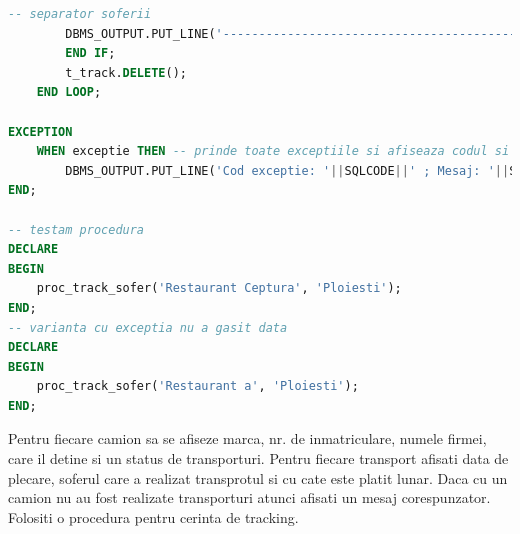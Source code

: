 \documentclass[12pt, a4paper]{article}
\begin{document}
\begin{lstlisting}[language=SQL]
        -- separator soferii
        DBMS_OUTPUT.PUT_LINE('-----------------------------------------------');     
        END IF;
        t_track.DELETE();
    END LOOP;

EXCEPTION
    WHEN exceptie THEN -- prinde toate exceptiile si afiseaza codul si mesajul
        DBMS_OUTPUT.PUT_LINE('Cod exceptie: '||SQLCODE||' ; Mesaj: '||SQLERRM);
END;

-- testam procedura
DECLARE
BEGIN
    proc_track_sofer('Restaurant Ceptura', 'Ploiesti');
END;
-- varianta cu exceptia nu a gasit data
DECLARE
BEGIN
    proc_track_sofer('Restaurant a', 'Ploiesti');
END;
\end{lstlisting}

Pentru fiecare camion sa se afiseze marca, nr. de inmatriculare, numele firmei,
care il detine si un status de transporturi. Pentru fiecare transport
afisati data de plecare, soferul care a realizat transprotul si cu cate este
platit lunar. Daca cu un camion nu au fost realizate transporturi atunci
afisati un mesaj corespunzator. Folositi o procedura pentru cerinta de tracking.
\end{document}
